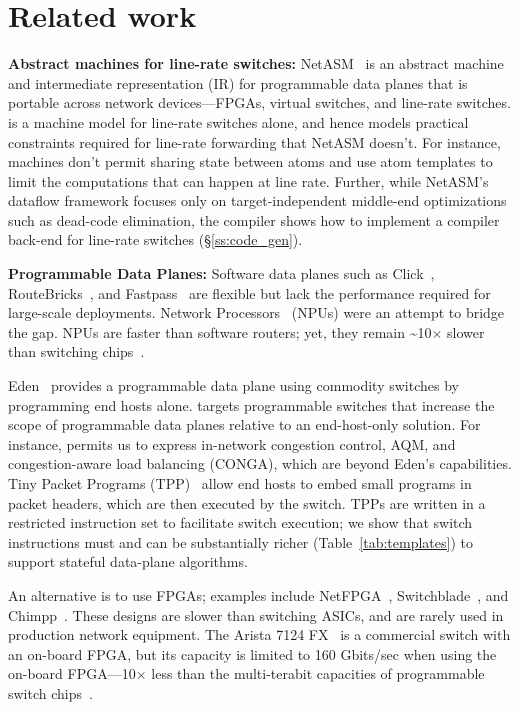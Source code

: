 \section{Related work}
\label{s:related}
\textbf{Abstract machines for line-rate switches:}
NetASM~\cite{netasm} is an abstract machine and intermediate representation
(IR) for programmable data planes that is portable across network
devices---FPGAs, virtual switches, and line-rate switches.  \absmachine is a
machine model for line-rate switches alone, and hence models practical
constraints required for line-rate forwarding that NetASM doesn't. For
instance, \absmachine machines don't permit sharing state between atoms and use
atom templates to limit the computations that can happen at line rate. Further,
while NetASM's dataflow framework focuses only on target-independent middle-end
optimizations such as dead-code elimination, the \pktlanguage compiler shows
how to implement a compiler back-end for line-rate switches
(\S\ref{ss:code_gen}).

\textbf{Programmable Data Planes:}
Software data planes such as Click~\cite{click},
RouteBricks~\cite{routebricks}, and Fastpass~\cite{fastpass} are flexible but
lack the performance required for large-scale deployments. Network
Processors~\cite{ixp2800, ixp4xx} (NPUs) were an attempt to bridge the gap.
NPUs are faster than software routers; yet, they remain
\textasciitilde10$\times$ slower than switching chips~\cite{rmt}.

Eden~\cite{eden} provides a programmable data plane using commodity switches by
programming end hosts alone. \pktlanguage targets programmable switches that
increase the scope of programmable data planes relative to an end-host-only
solution. For instance, \pktlanguage permits us to express in-network
congestion control, AQM, and congestion-aware load balancing (CONGA), which are
beyond Eden's capabilities. Tiny Packet Programs (TPP)~\cite{tpp} allow end
hosts to embed small programs in packet headers, which are then executed by the
switch. TPPs are written in a restricted instruction set to facilitate switch
execution; we show that switch instructions must and can be substantially
richer (Table~\ref{tab:templates}) to support stateful data-plane algorithms.

An alternative is to use FPGAs; examples include NetFPGA~\cite{netfpga},
Switchblade~\cite{switchblade}, and Chimpp~\cite{chimpp}.  These designs are
slower than switching ASICs, and are rarely used in production network
equipment. The Arista 7124 FX~\cite{7124fx} is a commercial switch with an
on-board FPGA, but its capacity is limited to 160 Gbits/sec when using the
on-board FPGA---10$\times$ less than the multi-terabit capacities of programmable
switch chips~\cite{xpliant}.

